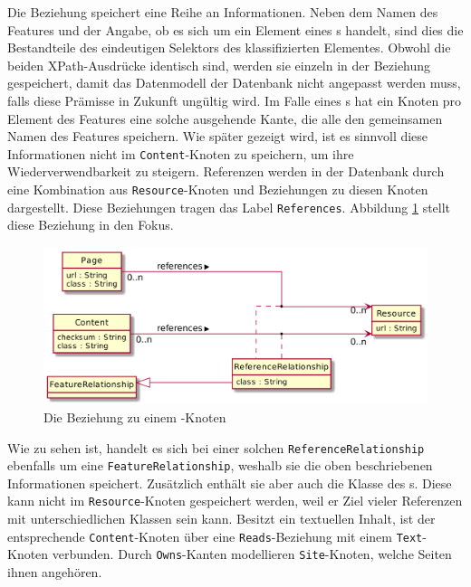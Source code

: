     Die Beziehung speichert eine Reihe an Informationen.
    Neben dem Namen des Features und der Angabe,
    ob es sich um ein Element eines {\collectionFeature}s handelt,
    sind dies die Bestandteile des eindeutigen Selektors des
    klassifizierten Elementes.
    Obwohl die beiden XPath-Ausdrücke identisch sind,
    werden sie einzeln in der Beziehung gespeichert, damit das Datenmodell der Datenbank
    nicht angepasst werden muss, falls diese Prämisse in Zukunft ungültig wird.
    Im Falle eines {\collectionFeature}s hat ein Knoten pro Element des Features eine solche
    ausgehende Kante, die alle den gemeinsamen Namen des Features speichern.
    Wie später gezeigt wird, ist es sinnvoll diese Informationen nicht im \texttt{Content}-Knoten
    zu speichern, um ihre Wiederverwendbarkeit zu
    steigern.
    Referenzen werden in der Datenbank durch eine Kombination aus
    \texttt{Resource}-Knoten und Beziehungen zu diesen Knoten dargestellt.
    Diese Beziehungen tragen das Label \texttt{References}.
    Abbildung \ref{image:dbDataModelResourceRelationship} stellt diese Beziehung in den Fokus.

    \begin{figure}[htb]
        \centering
        \includegraphics[scale=\imageScalingFactor]{../resources/db-data-model/resource-relationship.png}
        \caption{Die Beziehung zu einem {\resource}-Knoten}
        \label{image:dbDataModelResourceRelationship}
    \end{figure}

    Wie zu sehen ist, handelt es sich bei einer solchen \texttt{ReferenceRelationship} ebenfalls
    um eine \texttt{FeatureRelationship}, weshalb sie die oben beschriebenen Informationen speichert.
    Zusätzlich enthält sie aber auch die Klasse des {}s.
    Diese kann nicht im \texttt{Resource}-Knoten gespeichert werden,
    weil er Ziel vieler Referenzen mit unterschiedlichen Klassen sein kann.
    Besitzt ein {\contentFeature} textuellen Inhalt,
    ist der entsprechende \texttt{Content}-Knoten über eine \texttt{Reads}-Beziehung
    mit einem \texttt{Text}-Knoten verbunden.
    Durch \texttt{Owns}-Kanten modellieren \texttt{Site}-Knoten,
    welche Seiten ihnen angehören.
